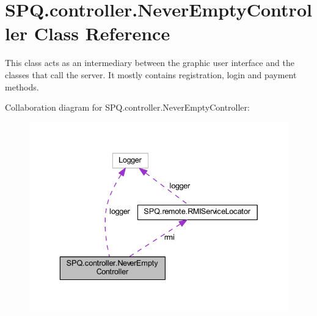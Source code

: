 \hypertarget{class_s_p_q_1_1controller_1_1_never_empty_controller}{}\section{S\+P\+Q.\+controller.\+Never\+Empty\+Controller Class Reference}
\label{class_s_p_q_1_1controller_1_1_never_empty_controller}


This class acts as an intermediary between the graphic user interface and the classes that call the server. It mostly contains registration, login and payment methods.  




Collaboration diagram for S\+P\+Q.\+controller.\+Never\+Empty\+Controller\+:
\nopagebreak
\begin{figure}[H]
\begin{center}
\leavevmode
\includegraphics[width=336pt]{class_s_p_q_1_1controller_1_1_never_empty_controller__coll__graph}
\end{center}
\end{figure}
